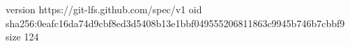 version https://git-lfs.github.com/spec/v1
oid sha256:0eafc16da74d9cbf8ed3d5408b13e1bbf049555206811863c9945b746b7cbbf9
size 124

